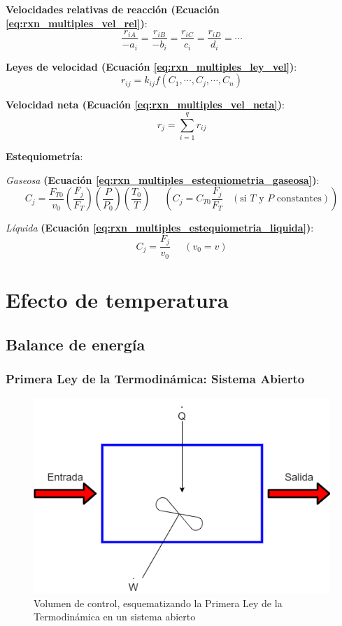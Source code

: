         \textbf{Velocidades relativas de reacción (Ecuación \ref{eq:rxn_multiples_vel_rel})}:
        \[\frac{r_{iA}}{-a_{i}} = \frac{r_{iB}}{-b_{i}} = \frac{r_{iC}}{c_{i}} = \frac{r_{iD}}{d_{i}} = \cdots\]
        
        \textbf{Leyes de velocidad (Ecuación \ref{eq:rxn_multiples_ley_vel})}:
        \[r_{ij} = k_{ij} f \left ( C_{1},\cdots,C_{j},\cdots,C_{n} \right )\]
        
        \textbf{Velocidad neta (Ecuación \ref{eq:rxn_multiples_vel_neta})}:
        \[r_{j} = \sum_{i=1}^{q} r_{ij}\]
        
        \textbf{Estequiometría}:
        
        \textit{Gaseosa} \textbf{(Ecuación \ref{eq:rxn_multiples_estequiometria_gaseosa})}:
        \[C_{j} = \frac{F_{T0}}{v_{0}} \left ( \frac{F_{j}}{F_{T}} \right ) \left ( \frac{P}{P_{0}} \right ) \left ( \frac{T_{0}}{T} \right ) \;\;\;\;\; \left ( C_{j} = C_{T0}\frac{F_{j}}{F_{T}} \;\;\; \left ( \text{si } T \text{ y } P \text{ constantes} \right ) \right )\]
        
        \textit{Líquida} \textbf{(Ecuación \ref{eq:rxn_multiples_estequiometria_liquida})}:
        \[C_{j} = \frac{F_{j}}{v_{0}} \;\;\;\;\; \left ( v_{0} = v \right )\]

\section{Efecto de temperatura}

    \subsection{Balance de energía}
    
        \subsubsection{Primera Ley de la Termodinámica: Sistema Abierto}
        
        \begin{figure}
            \centering
            \includegraphics[width=.5\textwidth]{img/diagramas/primera_ley_sistema_abierto.png}
            \caption{Volumen de control, esquematizando la Primera Ley de la Termodinámica en un sistema abierto}
            \label{fig:primera_ley_sistema_abierto}
        \end{figure}
            
